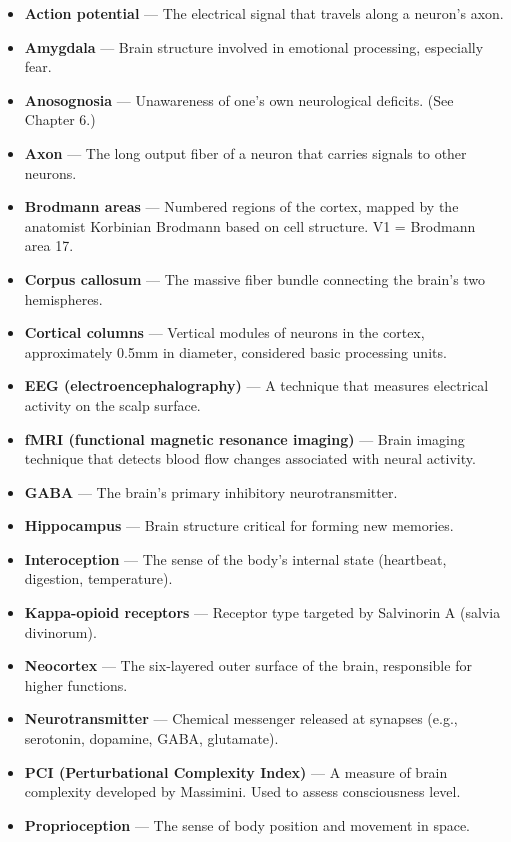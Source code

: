 \documentclass[11pt, twoside, openright]{book}
\begin{document}
\begin{itemize}
  \item \textbf{Action potential} --- The electrical signal that travels along a neuron's axon.
  \item \textbf{Amygdala} --- Brain structure involved in emotional processing, especially fear.
  \item \textbf{Anosognosia} --- Unawareness of one's own neurological deficits. (See Chapter 6.)
  \item \textbf{Axon} --- The long output fiber of a neuron that carries signals to other neurons.
  \item \textbf{Brodmann areas} --- Numbered regions of the cortex, mapped by the anatomist Korbinian Brodmann based on cell structure. V1 = Brodmann area 17.
  \item \textbf{Corpus callosum} --- The massive fiber bundle connecting the brain's two hemispheres.
  \item \textbf{Cortical columns} --- Vertical modules of neurons in the cortex, approximately 0.5mm in diameter, considered basic processing units.
  \item \textbf{EEG (electroencephalography)} --- A technique that measures electrical activity on the scalp surface.
  \item \textbf{fMRI (functional magnetic resonance imaging)} --- Brain imaging technique that detects blood flow changes associated with neural activity.
  \item \textbf{GABA} --- The brain's primary inhibitory neurotransmitter.
  \item \textbf{Hippocampus} --- Brain structure critical for forming new memories.
  \item \textbf{Interoception} --- The sense of the body's internal state (heartbeat, digestion, temperature).
  \item \textbf{Kappa-opioid receptors} --- Receptor type targeted by Salvinorin A (salvia divinorum).
  \item \textbf{Neocortex} --- The six-layered outer surface of the brain, responsible for higher functions.
  \item \textbf{Neurotransmitter} --- Chemical messenger released at synapses (e.g., serotonin, dopamine, GABA, glutamate).
  \item \textbf{PCI (Perturbational Complexity Index)} --- A measure of brain complexity developed by Massimini. Used to assess consciousness level.
  \item \textbf{Proprioception} --- The sense of body position and movement in space.

\end{itemize}
\end{document}
